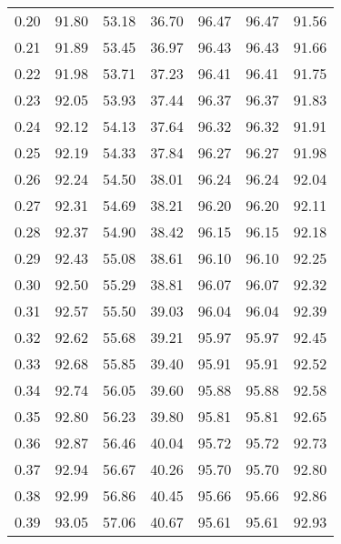 \begin{tabular}{|c|c|c|c|c|c|c|}
      0.20 &     91.80 &     53.18 &      36.70 &   96.47 &      96.47 &         91.56 \\
      0.21 &     91.89 &     53.45 &      36.97 &   96.43 &      96.43 &         91.66 \\
      0.22 &     91.98 &     53.71 &      37.23 &   96.41 &      96.41 &         91.75 \\
      0.23 &     92.05 &     53.93 &      37.44 &   96.37 &      96.37 &         91.83 \\
      0.24 &     92.12 &     54.13 &      37.64 &   96.32 &      96.32 &         91.91 \\
      0.25 &     92.19 &     54.33 &      37.84 &   96.27 &      96.27 &         91.98 \\
      0.26 &     92.24 &     54.50 &      38.01 &   96.24 &      96.24 &         92.04 \\
      0.27 &     92.31 &     54.69 &      38.21 &   96.20 &      96.20 &         92.11 \\
      0.28 &     92.37 &     54.90 &      38.42 &   96.15 &      96.15 &         92.18 \\
      0.29 &     92.43 &     55.08 &      38.61 &   96.10 &      96.10 &         92.25 \\
      0.30 &     92.50 &     55.29 &      38.81 &   96.07 &      96.07 &         92.32 \\
      0.31 &     92.57 &     55.50 &      39.03 &   96.04 &      96.04 &         92.39 \\
      0.32 &     92.62 &     55.68 &      39.21 &   95.97 &      95.97 &         92.45 \\
      0.33 &     92.68 &     55.85 &      39.40 &   95.91 &      95.91 &         92.52 \\
      0.34 &     92.74 &     56.05 &      39.60 &   95.88 &      95.88 &         92.58 \\
      0.35 &     92.80 &     56.23 &      39.80 &   95.81 &      95.81 &         92.65 \\
      0.36 &     92.87 &     56.46 &      40.04 &   95.72 &      95.72 &         92.73 \\
      0.37 &     92.94 &     56.67 &      40.26 &   95.70 &      95.70 &         92.80 \\
      0.38 &     92.99 &     56.86 &      40.45 &   95.66 &      95.66 &         92.86 \\
      0.39 &     93.05 &     57.06 &      40.67 &   95.61 &      95.61 &         92.93 \\

\end{tabular}
